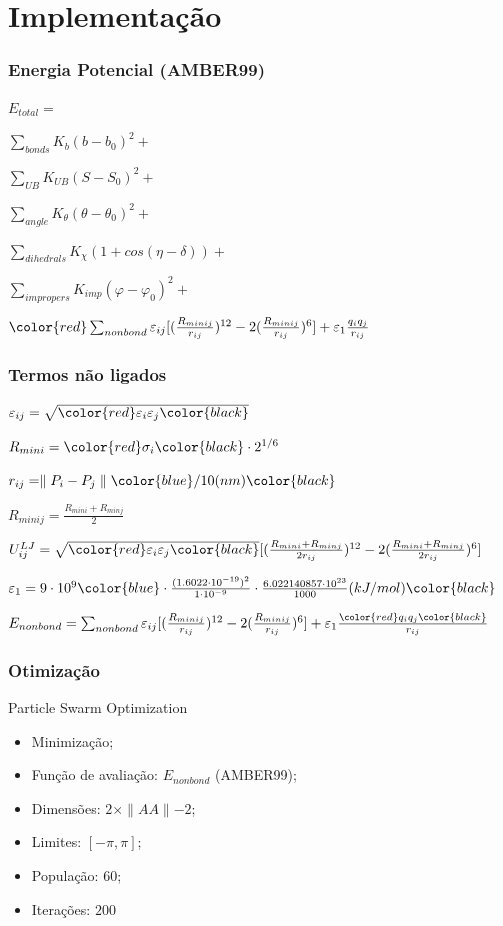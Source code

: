 \documentclass{beamer}
\begin{document}
\section{Implementação} %

\begin{frame}
\frametitle{Energia Potencial (AMBER99)}
$E_{total} = $

$\sum_{bonds} K_{b}(b - b_0)^2 + $

$\sum_{UB} K_{UB}(S - S_0)^2 + $

$\sum_{angle} K_{\theta}(\theta - \theta_0)^2 + $

$\sum_{dihedrals} K_{\chi}(1 + cos(\eta - \delta)) + $

$\sum_{impropers} K_{imp}(\varphi - \varphi_0)^2 + $

$\color{red}\sum_{nonbond} \varepsilon_{ij} [(\frac{R_{minij}}{r_{ij}})^{12} -2(\frac{R_{minij}}{r_{ij}})^6] + \varepsilon_1 \frac{q_i q_j}{r_{ij}} $
\end{frame}

\begin{frame}
\frametitle{Termos não ligados}
$\varepsilon_{ij} = \sqrt{ \color{red} \varepsilon_i \varepsilon_j \color{black} }$

$R_{mini} = \color{red}\sigma_i \color{black} \cdot 2^{1/6}$

$r_{ij} = \parallel P_i - P_j \parallel \color{blue}/10 (nm) \color{black}$ 

$R_{minij} = \frac{R_{mini} + R_{minj}}{2}$

$U^{LJ}_{ij} = \sqrt{ \color{red} \varepsilon_i \varepsilon_j \color{black} } [(\frac{R_{mini} + R_{minj}}{2r_{ij}})^{12} -2(\frac{R_{mini} + R_{minj}}{2r_{ij}})^{6}]$

$\varepsilon_1 = 9 \cdot 10^9 \color{blue} \cdot \frac{(1.6022 \cdot 10^{-19})^2}{1 \cdot 10^{-9}} \cdot \frac{6.022140857 \cdot 10^{23}}{1000} (kJ/mol) \color{black}$

$E_{nonbond} = \sum_{nonbond} \varepsilon_{ij} [(\frac{R_{minij}}{r_{ij}})^{12} -2(\frac{R_{minij}}{r_{ij}})^6] + \varepsilon_1 \frac{\color{red}q_i q_j \color{black}}{r_{ij}}$
\end{frame}

\begin{frame}
\frametitle{Otimização}
Particle Swarm Optimization
\begin{itemize}
  \item Minimização;
  \item Função de avaliação: $E_{nonbond}$ (AMBER99);
  \item Dimensões: $2 \times \parallel AA \parallel - 2$;
  \item Limites: $[-\pi, \pi]$;
  \item População: $60$;
  \item Iterações: $200$
\end{itemize}
\end{frame}
\end{document}
